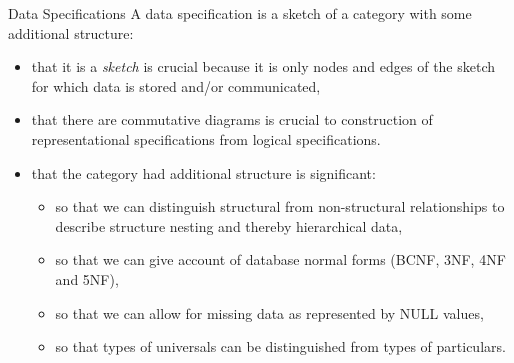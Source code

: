 \begin{frame}{Data Specifications}
A data specification is a sketch of a category with some additional structure:
\begin{itemize}
\item that it is a \textit{sketch} is crucial because it is only nodes and edges of the sketch for which data is stored and/or communicated, 
\item that there are commutative diagrams is crucial to construction of representational 
specifications from logical specifications.
\item that the category had additional structure is significant:
\begin{itemize}
\item so that we can distinguish structural from non-structural relationships to describe structure nesting and thereby hierarchical data,
\item so that we can give account of database normal forms 
(BCNF, 3NF, 4NF and 5NF),
\item so that we can allow for missing data as represented by NULL values, 
\item so that types of universals can be distinguished from types of particulars.
\end{itemize}
\end{itemize}
\end{frame}


